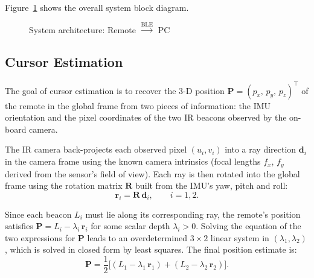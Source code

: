 \documentclass[12pt, a4paper]{article}
\begin{document}
Figure~\ref{fig:architecture} shows the overall system block diagram.

\begin{figure}[H]
    \centering
    \caption{System architecture: Remote $\xrightarrow{\text{BLE}}$ PC}
    \label{fig:architecture}
\end{figure}






\subsection{Cursor Estimation}

The goal of cursor estimation is to recover the 3-D position
$\mathbf{P} = (p_x,\, p_y,\, p_z)^\top$ of the remote in the global frame
from two pieces of information: the IMU orientation and the pixel coordinates
of the two IR beacons observed by the on-board camera.

The IR camera back-projects each observed pixel $(u_i, v_i)$ into a ray
direction $\mathbf{d}_i$ in the camera frame using the
known camera intrinsics (focal lengths $f_x$, $f_y$ derived from the sensor's
field of view). Each ray is then rotated into the global frame using the
rotation matrix $\mathbf{R}$ built from the IMU's yaw, pitch and roll:
\begin{equation}
    \mathbf{r}_i = \mathbf{R}\,\mathbf{d}_i, \qquad i = 1, 2.
\end{equation}

Since each beacon $L_i$ must lie along its corresponding ray, the remote's
position satisfies $\mathbf{P} = L_i - \lambda_i\,\mathbf{r}_i$ for some
scalar depth $\lambda_i > 0$. Solving the equation of the two expressions for $\mathbf{P}$
leads to an overdetermined $3 \times 2$ linear system in $(\lambda_1, \lambda_2)$,
which is solved in closed form by least squares. The final position estimate is:
\begin{equation}
    \mathbf{P} = \frac{1}{2}\bigl[
        (L_1 - \lambda_1\,\mathbf{r}_1) + (L_2 - \lambda_2\,\mathbf{r}_2)
    \bigr].
\end{equation}
\end{document}
